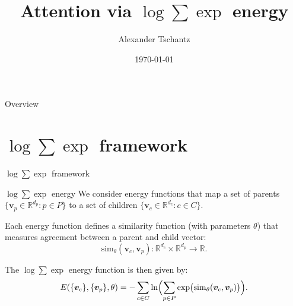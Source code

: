 \documentclass{beamer}
\title{Attention via $\log \sum \exp$ energy}
\author{Alexander Tschantz}
\date{\today}
\begin{document}
\begin{frame}
  \titlepage
\end{frame}

\begin{frame}{Overview}
\tableofcontents
\end{frame}

\section{$\log \sum \exp$ framework}

\begin{frame}
    \centering
    \Huge $\log \sum \exp$ framework
\end{frame}

\begin{frame}{$\log \sum \exp$ energy}
    \large
    We consider energy functions that map a set of parents \(\{\bm{v}_p \in \mathbb{R}^{d_p} : p \in P\}\) to a set of children \(\{\bm{v}_c \in \mathbb{R}^{d_c} : c \in C\}\). 
    
    \bigskip

    Each energy function defines a similarity function (with parameters $\theta$) that measures agreement between a parent and child vector:
    \[
    \mathrm{sim}_\theta(\bm{v}_c, \bm{v}_p) : \mathbb{R}^{d_c} \times \mathbb{R}^{d_p} \to \mathbb{R}.
    \]
    
    \bigskip

    The $\log \sum \exp$ energy function is then given by:
    \[
    E(\{\bm{v}_c\}, \{\bm{v}_p\}, \theta) = -\sum_{c \in C} \ln \Bigl(\sum_{p \in P} \exp\bigl(\mathrm{sim}_\theta(\bm{v}_c, \bm{v}_p)\bigr)\Bigr).
    \]
\end{frame}
    
\end{document}
